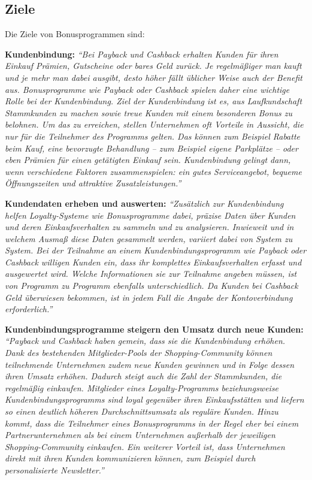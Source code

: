 \subsection {Ziele}
Die Ziele von Bonusprogrammen sind: \newline

\noindent \textbf{Kundenbindung:} \textit{``Bei Payback und Cashback erhalten Kunden für ihren Einkauf Prämien, Gutscheine oder bares Geld zurück. Je regelmäßiger man kauft und je mehr man dabei ausgibt, desto höher fällt üblicher Weise auch der Benefit aus. Bonusprogramme wie Payback oder Cashback spielen daher eine wichtige Rolle bei der Kundenbindung. Ziel der Kundenbindung ist es, aus Laufkundschaft Stammkunden zu machen sowie treue Kunden mit einem besonderen Bonus zu belohnen. Um das zu erreichen, stellen Unternehmen oft Vorteile in Aussicht, die nur für die Teilnehmer des Programms gelten. Das können zum Beispiel Rabatte beim Kauf, eine bevorzugte Behandlung – zum Beispiel eigene Parkplätze – oder eben Prämien für einen getätigten Einkauf sein. Kundenbindung gelingt dann, wenn verschiedene Faktoren zusammenspielen: ein gutes Serviceangebot, bequeme Öffnungszeiten und attraktive Zusatzleistungen.'' \cite{paycashback_all}} \newline

\noindent \textbf{Kundendaten erheben und auswerten:} \textit{``Zusätzlich zur Kundenbindung helfen Loyalty-Systeme wie Bonusprogramme dabei, präzise Daten über Kunden und deren Einkaufsverhalten zu sammeln und zu analysieren. Inwieweit und in welchem Ausmaß diese Daten gesammelt werden, variiert dabei von System zu System. Bei der Teilnahme an einem Kundenbindungsprogramm wie Payback oder Cashback willigen Kunden ein, dass ihr komplettes Einkaufsverhalten erfasst und ausgewertet wird. Welche Informationen sie zur Teilnahme angeben müssen, ist von Programm zu Programm ebenfalls unterschiedlich. Da Kunden bei Cashback Geld überwiesen bekommen, ist in jedem Fall die Angabe der Kontoverbindung erforderlich.'' \cite{paycashback_all}} \newline

\noindent \textbf{Kundenbindungsprogramme steigern den Umsatz durch neue Kunden:} \textit{``Payback und Cashback haben gemein, dass sie die Kundenbindung erhöhen. Dank des bestehenden Mitglieder-Pools der Shopping-Community können teilnehmende Unternehmen zudem neue Kunden gewinnen und in Folge dessen ihren Umsatz erhöhen. Dadurch steigt auch die Zahl der Stammkunden, die regelmäßig einkaufen. Mitglieder eines Loyalty-Programms beziehungsweise Kundenbindungsprogramms sind loyal gegenüber ihren Einkaufsstätten und liefern so einen deutlich höheren Durchschnittsumsatz als reguläre Kunden. Hinzu kommt, dass die Teilnehmer eines Bonusprogramms in der Regel eher bei einem Partnerunternehmen als bei einem Unternehmen außerhalb der jeweiligen Shopping-Community einkaufen. Ein weiterer Vorteil ist, dass Unternehmen direkt mit ihren Kunden kommunizieren können, zum Beispiel durch personalisierte Newsletter.'' \cite{paycashback_all}} \newline